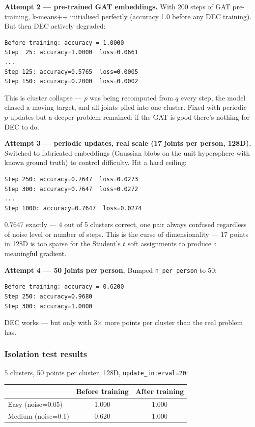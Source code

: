 \textbf{Attempt 2 --- pre-trained GAT embeddings.}
With 200 steps of GAT pre-training, k-means++ initialised perfectly (accuracy 1.0 before any DEC training). But then DEC actively degraded:

\begin{verbatim}
Before training: accuracy = 1.0000
Step  25: accuracy=1.0000  loss=0.0661
...
Step 125: accuracy=0.5765  loss=0.0005
Step 150: accuracy=0.2000  loss=0.0002
\end{verbatim}

This is cluster collapse --- $p$ was being recomputed from $q$ every step, the model chased a moving target, and all joints piled into one cluster. Fixed with periodic $p$ updates but a deeper problem remained: if the GAT is good there's nothing for DEC to do.

\textbf{Attempt 3 --- periodic updates, real scale (17 joints per person, 128D).}
Switched to fabricated embeddings (Gaussian blobs on the unit hypersphere with known ground truth) to control difficulty. Hit a hard ceiling:

\begin{verbatim}
Step 250: accuracy=0.7647  loss=0.0273
Step 300: accuracy=0.7647  loss=0.0272
...
Step 1000: accuracy=0.7647  loss=0.0274
\end{verbatim}

0.7647 exactly --- 4 out of 5 clusters correct, one pair always confused regardless of noise level or number of steps. This is the curse of dimensionality --- 17 points in 128D is too sparse for the Student's $t$ soft assignments to produce a meaningful gradient.

\textbf{Attempt 4 --- 50 joints per person.}
Bumped \texttt{n\_per\_person} to 50:

\begin{verbatim}
Before training: accuracy = 0.6200
Step 250: accuracy=0.9680
Step 300: accuracy=1.0000
\end{verbatim}

DEC works --- but only with 3$\times$ more points per cluster than the real problem has.


\subsubsection{Isolation test results}

5 clusters, 50 points per cluster, 128D, \texttt{update\_interval=20}:

\begin{center}
\begin{tabular}{lcc}
\toprule
 & Before training & After training \\
\midrule
Easy (noise=0.05) & 1.000 & 1.000 \\
Medium (noise=0.1) & 0.620 & 1.000 \\
\bottomrule
\end{tabular}
\end{center}

